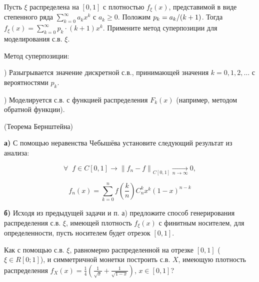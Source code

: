 \begin{problem}

Пусть $\xi $ распределена на $\left[0,1\right]$ с плотностью $f_{\xi } (x)$, представимой в виде степенного ряда $\sum _{k=0}^{\infty }a_{k} x^{k}  $ с $a_{k} \ge 0$. Положим $p_{k} ={a_{k} \mathord{\left/ {\vphantom {a_{k}  (k+1)}} \right. \kern-\nulldelimiterspace} (k+1)} $. Тогда $f_{\xi } (x)=\sum _{k=0}^{\infty }p_{k} \cdot (k+1)x^{k}  $. Примените метод суперпозиции для моделирования с.в. $\xi $.

\begin{ordre}
Метод суперпозиции:

) Разыгрывается значение дискретной с.в., принимающей значения $k=0,1,2,...$ с вероятностями $p_{k} $.

) Моделируется с.в. с функцией распределения $F_{k} (x)$ (например, методом обратной функции).

\end{ordre}

\end{problem}

\begin{problem}
(Теорема Бернштейна) 

\textbf{а)} С помощью неравенства Чебышёва установите следующий результат из анализа: 

\[
\forall \; \; f\in C\left[0,1\right]\to \left\| f_{n} -f\right\| _{C\left[0,1\right]} \xrightarrow[{n\to \infty }]{} 0,
\] 

\[
f_{n} \left(x\right)=\sum_{k=0}^{n}f\left(\frac{k}{n} \right) C_{n}^{k} x^{k} \left(1-x\right)^{n-k} 
\]

\textbf{б)} Исходя из предыдущей задачи и п. а) предложите способ генерирования распределения с.в. $\xi $, имеющей плотность $f_{\xi } \left(x\right)$ с финитным носителем, для определенности, пусть носителем будет отрезок $\left[0,1\right]$.
\end{problem}

\begin{problem}
Как с помощью с.в. $\xi $, равномерно распределенной на отрезке $\left[0,1\right]$ ($\xi \in R\left[0;1\right]$), и симметричной монетки построить с.в. $X$, имеющую плотность распределения $f_{X} (x)=\frac{1}{4} \left(\frac{1}{\sqrt{x} } +\frac{1}{\sqrt{1-x} } \right)$, $x\in \left[0,1\right]$?
\end{problem}

